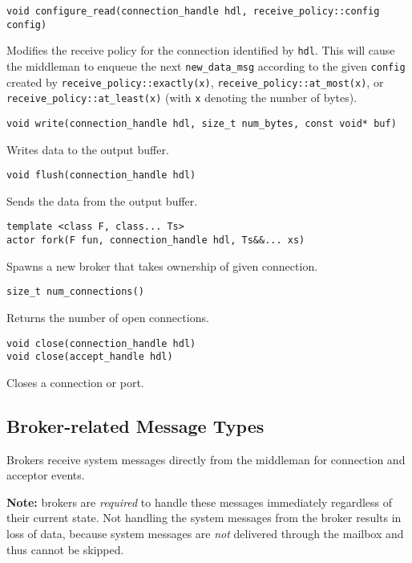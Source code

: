 \begin{lstlisting}
void configure_read(connection_handle hdl, receive_policy::config config)
\end{lstlisting}

Modifies the receive policy for the connection identified by \lstinline^hdl^. This will cause the middleman to enqueue the next \lstinline^new_data_msg^ according to the given \lstinline^config^ created by \lstinline^receive_policy::exactly(x)^, \lstinline^receive_policy::at_most(x)^, or \lstinline^receive_policy::at_least(x)^ (with \lstinline^x^ denoting the number of bytes).

\begin{lstlisting}
void write(connection_handle hdl, size_t num_bytes, const void* buf)
\end{lstlisting}

Writes data to the output buffer.

\begin{lstlisting}
void flush(connection_handle hdl)
\end{lstlisting}

Sends the data from the output buffer.

\clearpage
\begin{lstlisting}
template <class F, class... Ts>
actor fork(F fun, connection_handle hdl, Ts&&... xs)
\end{lstlisting}

Spawns a new broker that takes ownership of given connection.

\begin{lstlisting}
size_t num_connections()
\end{lstlisting}

Returns the number of open connections.

\begin{lstlisting}
void close(connection_handle hdl)
void close(accept_handle hdl)
\end{lstlisting}

Closes a connection or port.

\subsection{Broker-related Message Types}

Brokers receive system messages directly from the middleman for connection and acceptor events.

\textbf{Note:} brokers are \emph{required} to handle these messages immediately regardless of their current state. Not handling the system messages from the broker results in loss of data, because system messages are \emph{not} delivered through the mailbox and thus cannot be skipped.

